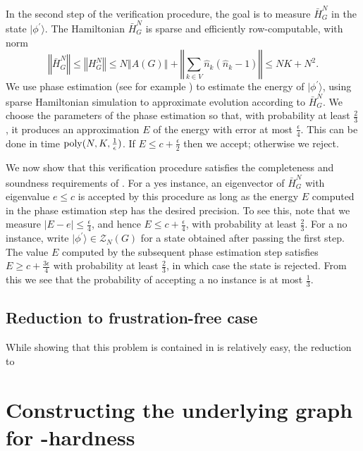 \documentclass[../thesis-main/thesis-main]{subfiles}
\begin{document}
In the second step of the verification procedure, the goal is to measure $\bar{H}_{G}^{N}$ in the state $|\phi^{\prime}\rangle$. The Hamiltonian $\bar{H}_{G}^{N}$ is sparse and efficiently row-computable, with norm
\[
\left\Vert \bar{H}_{G}^{N}\right\Vert \leq\left\Vert H_{G}^{N}\right\Vert \leq N\left\Vert A(G)\right\Vert +\left\Vert \sum_{k\in V}\hat{n}_{k}\left(\hat{n}_{k}-1\right)\right\Vert \leq NK+N^{2}.
\]
We use phase estimation (see for example \cite{CEMM98}) to estimate the energy of $|\phi^{\prime}\rangle$, using sparse Hamiltonian simulation \cite{AT03} to approximate evolution according to $\bar{H}_{G}^{N}$. We choose the parameters of the phase estimation so that, with probability at least $\frac{2}{3}$, it produces an approximation $E$ of the energy with error at most $\frac{\epsilon}{4}$. This can be done in time $\operatorname{poly}(N,K,\frac{1}{\epsilon})$. If $E\leq c+\frac{\epsilon}{2}$ then we accept; otherwise we reject.

We now show that this verification procedure satisfies the completeness and soundness requirements of . For a yes instance, an eigenvector of $\bar{H}_{G}^{N}$ with eigenvalue $e\leq c$ is accepted by this procedure as long as the energy $E$ computed in the phase estimation step has the desired precision. To see this, note that we measure $\left|E-e\right|\leq\frac{\epsilon}{4}$, and hence $E\leq c+\frac{\epsilon}{4}$, with probability at least $\frac{2}{3}$.  For a no instance, write $|\phi^{\prime}\rangle\in\mathcal{Z}_{N}(G)$ for a state obtained after passing the first step. The value $E$ computed by the subsequent phase estimation step satisfies $E\geq c+\frac{3\epsilon}{4}$ with probability at least $\frac{2}{3}$, in which case the state is rejected. From this we see that the probability of accepting a no instance is at most $\frac{1}{3}$.



\subsection{Reduction to frustration-free case}

While showing that this problem is contained in \QMA is relatively easy, the reduction to 

\section{Constructing the underlying graph for \QMA-hardness}
\end{document}
